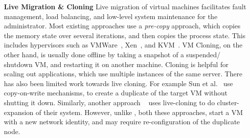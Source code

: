 \textbf{Live Migration \& Cloning}
Live migration of virtual machines facilitates fault management, load balancing, and low-level system maintenance for the administrator.
Most existing approaches use a \textit{pre-copy} approach, which copies the memory state over several iterations, and then copies the process state.
This includes hypervisors such as VMWare~\cite{nelson2005fast}, Xen~\cite{clark2005live}, and KVM~\cite{kivity2007kvm}.
VM Cloning, on the other hand, is usually done offline by taking a snapshot of a suspended/ shutdown VM, and restarting it on another machine.
Cloning is helpful for scaling out applications, which use multiple instances of the same server.
There has also been limited work towards live cloning. 
For example Sun et al.~\cite{Sun:2009:FLC:1581383.1582148} use copy-on-write mechanisms, to create a duplicate of the target VM without shutting it down.
Similarly, another approach ~\cite{gebhart2009dynamic} uses live-cloning to do cluster-expansion of their system.
However, unlike \parikshan, both these approaches, start a VM with a new network identity, and may require re-configuration of the duplicate node.
  